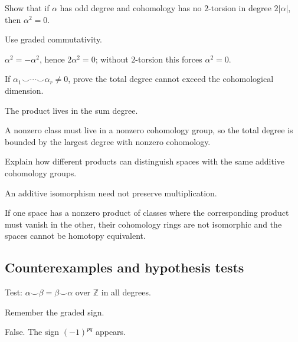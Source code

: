 \begin{exercise}\label{exr:viii29-ped-07}
Show that if $\alpha$ has odd degree and cohomology has no $2$-torsion in degree $2|\alpha|$, then $\alpha^2=0$.
\end{exercise}
\begin{hint}
Use graded commutativity.
\end{hint}
\begin{solution}
$\alpha^2=-\alpha^2$, hence $2\alpha^2=0$; without $2$-torsion this forces $\alpha^2=0$.
\end{solution}

\begin{exercise}\label{exr:viii29-ped-08}
If $\alpha_1\smile\cdots\smile\alpha_r\ne0$, prove the total degree cannot exceed the cohomological dimension.
\end{exercise}
\begin{hint}
The product lives in the sum degree.
\end{hint}
\begin{solution}
A nonzero class must live in a nonzero cohomology group, so the total degree is bounded by the largest degree with nonzero cohomology.
\end{solution}

\begin{exercise}\label{exr:viii29-ped-09}
Explain how different products can distinguish spaces with the same additive cohomology groups.
\end{exercise}
\begin{hint}
An additive isomorphism need not preserve multiplication.
\end{hint}
\begin{solution}
If one space has a nonzero product of classes where the corresponding product must vanish in the other, their cohomology rings are not isomorphic and the spaces cannot be homotopy equivalent.
\end{solution}

\subsection*{Counterexamples and hypothesis tests}

\begin{exercise}\label{exr:viii29-ped-10}
Test: $\alpha\smile\beta=\beta\smile\alpha$ over $\mathbb Z$ in all degrees.
\end{exercise}
\begin{hint}
Remember the graded sign.
\end{hint}
\begin{solution}
False. The sign $(-1)^{pq}$ appears.
\end{solution}

